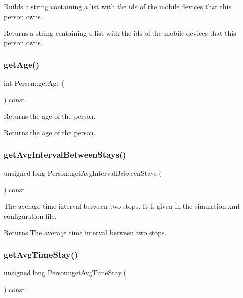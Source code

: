 Builds a string containing a list with the ids of the mobile devices that this person owns. \begin{DoxyReturn}{Returns}
a string containing a list with the ids of the mobile devices that this person owns. 
\end{DoxyReturn}
\mbox{\label{class_person_a4b66dbee570398920b8fb6aacddd2559}} 
\subsubsection{\texorpdfstring{getAge()}{getAge()}}
{\footnotesize\ttfamily int Person\+::get\+Age (\begin{DoxyParamCaption}{ }\end{DoxyParamCaption}) const}

Returns the age of the person. \begin{DoxyReturn}{Returns}
the age of the person. 
\end{DoxyReturn}
\mbox{\label{class_person_a59d3ea8e10928537043ee7b3d24a470c}} 
\subsubsection{\texorpdfstring{getAvgIntervalBetweenStays()}{getAvgIntervalBetweenStays()}}
{\footnotesize\ttfamily unsigned long Person\+::get\+Avg\+Interval\+Between\+Stays (\begin{DoxyParamCaption}{ }\end{DoxyParamCaption}) const}

The average time interval between two stops. It is given in the simulation.\+xml configuration file. \begin{DoxyReturn}{Returns}
The average time interval between two stops. 
\end{DoxyReturn}
\mbox{\label{class_person_a2b01d9997db6f6d4555dbc5ac9898077}} 
\subsubsection{\texorpdfstring{getAvgTimeStay()}{getAvgTimeStay()}}
{\footnotesize\ttfamily unsigned long Person\+::get\+Avg\+Time\+Stay (\begin{DoxyParamCaption}{ }\end{DoxyParamCaption}) const}

